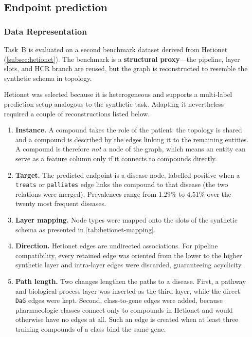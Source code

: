 \newpage %
\subsection{Endpoint prediction}
\label{subsec:benchmark-endpoint}

\subsubsection{Data Representation}

Task~B is evaluated on a second benchmark dataset derived from Hetionet
(\cref{subsec:hetionet}). The
benchmark is a \textbf{structural proxy}---the
pipeline, layer slots, and HCR branch are reused, but the graph is
reconstructed to resemble the synthetic schema in topology.

Hetionet was selected because it is heterogeneous and supports a
multi-label prediction setup analogous to the synthetic
task. Adapting it nevertheless required a couple of reconstructions
listed below.

\begin{enumerate}[label=(\roman*)]
  \item \textbf{Instance.} A compound takes the role of the patient: the
    topology is shared and a compound is described by the edges linking it to
    the remaining entities. A compound is therefore \emph{not} a node of the
    graph, which means an entity can serve as a feature column only if it
    connects to compounds directly.

  \item \textbf{Target.} The predicted endpoint is a disease node, labelled positive when a
  \texttt{treats} or \texttt{palliates} edge links the compound to that disease
  (the two relations were merged).
  Prevalences range from $1.29\%$ to $4.51\%$ over the twenty most frequent
  diseases. 

  \item \textbf{Layer mapping.} Node types were mapped onto the slots of the
    synthetic schema as presented in \cref{tab:hetionet-mapping}.

  \item \textbf{Direction.} Hetionet edges are undirected associations.
    For pipeline compatibility, every retained edge was oriented from the
    lower to the higher synthetic layer and intra-layer edges were
    discarded, guaranteeing acyclicity. 

  \item \textbf{Path length.} Two changes lengthen the paths to a disease. First, a pathway and
  biological-process layer was inserted as the third layer, while the direct
  \texttt{DaG} edges were kept. Second, class-to-gene edges were added, because
  pharmacologic classes connect only to compounds in Hetionet and would otherwise
  have no edges at all. Such an edge is created when at least three training
  compounds of a class bind the same gene.

\end{enumerate}


